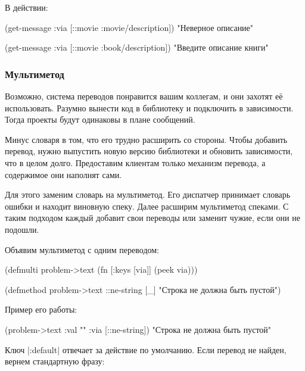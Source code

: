 \noindent
В действии:

  \begin{clojure}
(get-message {:via [::movie :movie/description]})
"Неверное описание"

(get-message {:via [::movie :book/description]})
"Введите описание книги"
  \end{clojure}

\subsubsection{Мультиметод}

Возможно, система переводов понравится вашим коллегам, и они захотят е\"{е}
использовать. Разумно вынести код в библиотеку и подключить в зависимости. Тогда
проекты будут одинаковы в плане сообщений.

Минус словаря в том, что его трудно расширить со стороны. Чтобы добавить
перевод, нужно выпустить новую версию библиотеки и обновить зависимости, что в
целом долго. Предоставим клиентам только механизм перевода, а содержимое они
наполнят сами.

Для этого заменим словарь на мультиметод. Его диспатчер принимает словарь ошибки
и находит виновную спеку. Далее расширим мультиметод спеками. С таким подходом
каждый добавит свои переводы или заменит чужие, если они не подошли.

Объявим мультиметод с одним переводом:


  \begin{clojure}
(defmulti problem->text
  (fn [{:keys [via]}]
    (peek via)))

(defmethod problem->text ::ne-string [_]
  "Строка не должна быть пустой")
  \end{clojure}

\noindent
Пример его работы:

  \begin{clojure}
(problem->text {:val "" :via [::ne-string]})
"Строка не должна быть пустой"
  \end{clojure}

Ключ \spverb|:default| отвечает за действие по умолчанию. Если перевод не
найден, вернем стандартную фразу:

